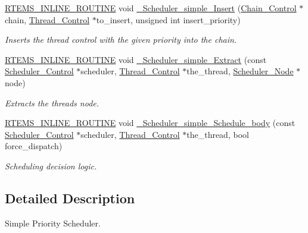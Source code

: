 \begin{DoxyCompactItemize}
\mbox{\hyperlink{group__RTEMSScoreBaseDefs_gac216239df231d5dbd15e3520b0b9313f}{R\+T\+E\+M\+S\+\_\+\+I\+N\+L\+I\+N\+E\+\_\+\+R\+O\+U\+T\+I\+NE}} void \mbox{\hyperlink{group__RTEMSScoreSchedulerSimple_gaa5300b25adb782773a0974c4a4419fb2}{\+\_\+\+Scheduler\+\_\+simple\+\_\+\+Insert}} (\mbox{\hyperlink{unionChain__Control}{Chain\+\_\+\+Control}} $\ast$chain, \mbox{\hyperlink{struct__Thread__Control}{Thread\+\_\+\+Control}} $\ast$to\+\_\+insert, unsigned int insert\+\_\+priority)
\begin{DoxyCompactList}\small\item\em Inserts the thread control with the given priority into the chain. \end{DoxyCompactList}\item 
\mbox{\hyperlink{group__RTEMSScoreBaseDefs_gac216239df231d5dbd15e3520b0b9313f}{R\+T\+E\+M\+S\+\_\+\+I\+N\+L\+I\+N\+E\+\_\+\+R\+O\+U\+T\+I\+NE}} void \mbox{\hyperlink{group__RTEMSScoreSchedulerSimple_ga7549ee4d228094320eb60678c0a42f15}{\+\_\+\+Scheduler\+\_\+simple\+\_\+\+Extract}} (const \mbox{\hyperlink{struct__Scheduler__Control}{Scheduler\+\_\+\+Control}} $\ast$scheduler, \mbox{\hyperlink{struct__Thread__Control}{Thread\+\_\+\+Control}} $\ast$the\+\_\+thread, \mbox{\hyperlink{structScheduler__Node}{Scheduler\+\_\+\+Node}} $\ast$node)
\begin{DoxyCompactList}\small\item\em Extracts the threads node. \end{DoxyCompactList}\item 
\mbox{\hyperlink{group__RTEMSScoreBaseDefs_gac216239df231d5dbd15e3520b0b9313f}{R\+T\+E\+M\+S\+\_\+\+I\+N\+L\+I\+N\+E\+\_\+\+R\+O\+U\+T\+I\+NE}} void \mbox{\hyperlink{group__RTEMSScoreSchedulerSimple_gad87c281f617f598c1e175f162224d6fb}{\+\_\+\+Scheduler\+\_\+simple\+\_\+\+Schedule\+\_\+body}} (const \mbox{\hyperlink{struct__Scheduler__Control}{Scheduler\+\_\+\+Control}} $\ast$scheduler, \mbox{\hyperlink{struct__Thread__Control}{Thread\+\_\+\+Control}} $\ast$the\+\_\+thread, bool force\+\_\+dispatch)
\begin{DoxyCompactList}\small\item\em Scheduling decision logic. \end{DoxyCompactList}\end{DoxyCompactItemize}


\subsection{Detailed Description}
Simple Priority Scheduler. 



